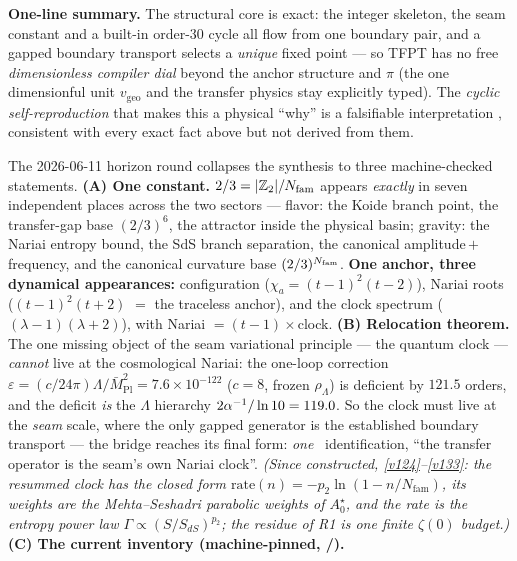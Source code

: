\par\smallskip\noindent\textbf{One-line summary.}
The structural core is exact: the integer skeleton, the seam constant and a built-in order-$30$ cycle all
flow from one boundary pair, and a gapped boundary transport selects a \emph{unique} fixed point --- so
TFPT has no free \emph{dimensionless compiler dial} beyond the anchor structure and $\pi$ (the one
dimensionful unit $v_{\mathrm{geo}}$ and the transfer physics stay explicitly typed). The
\emph{cyclic self-reproduction} that
makes this a physical ``why'' is a falsifiable interpretation \mC, consistent with every exact fact above
but not derived from them.

\begin{keybox}
The 2026-06-11 horizon round collapses the synthesis to three machine-checked statements.
\textbf{(A) One constant.} $2/3=|\mathbb Z_2|/N_{\mathrm{fam}}$ appears \emph{exactly} in seven independent places across
the two sectors --- flavor: the Koide branch point, the transfer-gap base $(2/3)^6$, the attractor inside
the physical basin; gravity: the Nariai entropy bound, the SdS branch separation, the canonical
amplitude\,$+$\,frequency, and the canonical curvature base $(2/3)^{N_{\mathrm{fam}}}$. \textbf{One anchor, three
dynamical appearances:} configuration ($\chi_a=(t{-}1)^2(t{-}2)$), Nariai roots ($(t{-}1)^2(t{+}2)$ $=$ the
traceless anchor), and the clock spectrum ($(\lambda{-}1)(\lambda{+}2)$), with Nariai $=(t{-}1)\times$clock.
\textbf{(B) Relocation theorem.} The one missing object of the seam variational principle --- the quantum
clock --- \emph{cannot} live at the cosmological Nariai: the one-loop correction
$\varepsilon=(c/24\pi)\Lambda/\bar M_{\mathrm{Pl}}^2=7.6\times10^{-122}$ ($c{=}8$, frozen $\rho_\Lambda$) is deficient by
$121.5$ orders, and the deficit \emph{is} the $\Lambda$ hierarchy $2\alpha^{-1}/\ln10=119.0$. So the clock must
live at the \emph{seam} scale, where the only gapped generator is the established boundary transport ---
the bridge reaches its final form: \emph{one} \mC\ identification, ``the transfer operator is the seam's
own Nariai clock''. \emph{(Since constructed, \vref{v124}--\vref{v133}: the resummed clock has the closed form
$\mathrm{rate}(n)=-p_2\ln(1-n/N_{\mathrm{fam}})$, its weights are the Mehta--Seshadri parabolic weights of
$A_0^\star$, and the rate is the entropy power law $\Gamma\propto(S/S_{dS})^{p_2}$; the residue of R1 is
one finite $\zeta(0)$ budget.)} \textbf{(C) The current inventory (machine-pinned, /).}

\end{keybox}

